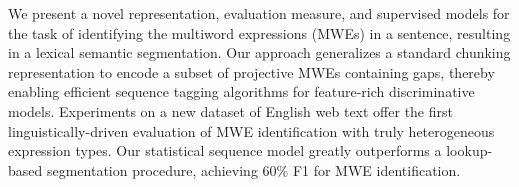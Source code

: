 We present a novel representation, evaluation measure, and supervised models for the task of identifying the multiword expressions (MWEs) in a sentence, resulting in a lexical semantic segmentation. Our approach generalizes a standard chunking  representation to encode a subset of projective MWEs containing  gaps, thereby enabling efficient sequence tagging algorithms for feature-rich discriminative models. Experiments on a new dataset of English web text offer the first linguistically-driven evaluation of MWE identification with truly heterogeneous expression types. Our statistical sequence model greatly outperforms a lookup-based segmentation procedure, achieving 60\% F1 for MWE identification.
